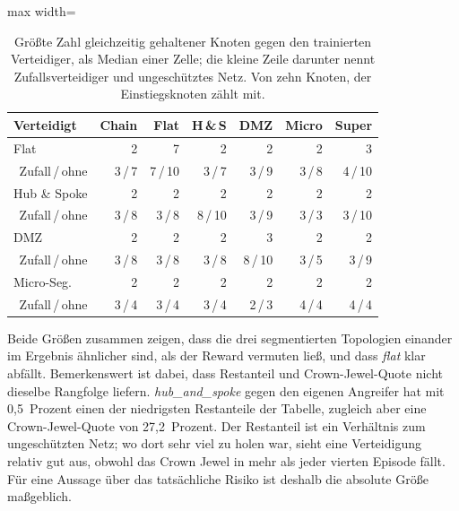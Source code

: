 \begin{table}[H]
  \centering
  \caption[Gehaltene Knoten in der Evaluation]{Größte Zahl gleichzeitig
  gehaltener Knoten gegen den trainierten Verteidiger, als Median einer
  Zelle; die kleine Zeile darunter nennt Zufallsverteidiger und
  ungeschütztes Netz. Von zehn Knoten, der Einstiegsknoten zählt mit.}
  \label{tab:knoten-eval}
  \footnotesize
  \setlength{\tabcolsep}{4pt}
  \begin{adjustbox}{max width=\textwidth}
  \begin{tabular}{l*{6}{r}}
    \toprule
    Verteidigt & Chain & Flat & H\,\&\,S & DMZ & Micro & Super \\
    \midrule
    Flat         & 2 & 7 & 2 & 2 & 2 & 3 \\
    \multicolumn{1}{r}{\scriptsize Zufall\,/\,ohne} & \scriptsize 3\,/\,7 & \scriptsize 7\,/\,10 & \scriptsize 3\,/\,7 & \scriptsize 3\,/\,9 & \scriptsize 3\,/\,8 & \scriptsize 4\,/\,10 \\[2pt]
    Hub \& Spoke & 2 & 2 & 2 & 2 & 2 & 2 \\
    \multicolumn{1}{r}{\scriptsize Zufall\,/\,ohne} & \scriptsize 3\,/\,8 & \scriptsize 3\,/\,8 & \scriptsize 8\,/\,10 & \scriptsize 3\,/\,9 & \scriptsize 3\,/\,3 & \scriptsize 3\,/\,10 \\[2pt]
    DMZ          & 2 & 2 & 2 & 3 & 2 & 2 \\
    \multicolumn{1}{r}{\scriptsize Zufall\,/\,ohne} & \scriptsize 3\,/\,8 & \scriptsize 3\,/\,8 & \scriptsize 3\,/\,8 & \scriptsize 8\,/\,10 & \scriptsize 3\,/\,5 & \scriptsize 3\,/\,9 \\[2pt]
    Micro-Seg.   & 2 & 2 & 2 & 2 & 2 & 2 \\
    \multicolumn{1}{r}{\scriptsize Zufall\,/\,ohne} & \scriptsize 3\,/\,4 & \scriptsize 3\,/\,4 & \scriptsize 3\,/\,4 & \scriptsize 2\,/\,3 & \scriptsize 4\,/\,4 & \scriptsize 4\,/\,4 \\[2pt]
    \bottomrule
  \end{tabular}
  \end{adjustbox}
\end{table}

Beide Größen zusammen zeigen, dass die drei segmentierten Topologien einander
im Ergebnis ähnlicher sind, als der Reward vermuten ließ, und dass \emph{flat}
klar abfällt. Bemerkenswert ist dabei, dass Restanteil und Crown-Jewel-Quote
nicht dieselbe Rangfolge liefern. \emph{hub\_and\_spoke} gegen den eigenen Angreifer hat
mit 0,5~Prozent einen der niedrigsten Restanteile der Tabelle, zugleich
aber eine Crown-Jewel-Quote von 27,2~Prozent. Der Restanteil ist ein Verhältnis zum
ungeschützten Netz; wo dort sehr viel zu holen war, sieht eine Verteidigung relativ
gut aus, obwohl das Crown Jewel in mehr als jeder vierten Episode fällt. Für
eine Aussage über das tatsächliche Risiko ist deshalb die absolute Größe
maßgeblich.

